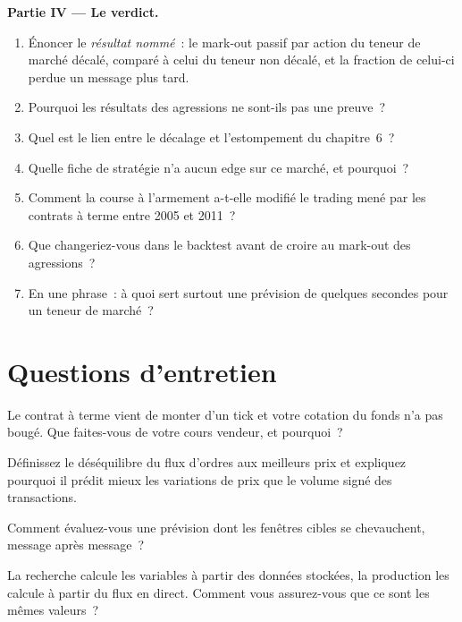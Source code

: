 \begin{problem}
\medskip\noindent\textbf{Partie IV --- Le verdict.}
\begin{enumerate}[resume]
\item Énoncer le \emph{résultat nommé}~: le mark-out passif par action du teneur de marché décalé, comparé à celui du teneur non décalé, et la fraction de celui-ci perdue
un message plus tard.
\item Pourquoi les résultats des agressions ne sont-ils pas une preuve~?
\item Quel est le lien entre le décalage et l'estompement du chapitre~6~?
\item Quelle fiche de stratégie n'a aucun edge sur ce marché, et pourquoi~?
\item Comment la course à l'armement a-t-elle modifié le trading mené par les contrats à terme entre 2005 et 2011~?
\item Que changeriez-vous dans le backtest avant de croire au mark-out des agressions~?
\item En une phrase~: à quoi sert surtout une prévision de quelques secondes pour un teneur de marché~?
\end{enumerate}
\end{problem}

\section{Questions d'entretien}

\begin{interviewq}\label{iq:hf:short-horizon-alpha:1}
Le contrat à terme vient de monter d'un tick et votre cotation du fonds n'a pas bougé. Que faites-vous de votre cours vendeur, et pourquoi~?
\end{interviewq}

\begin{interviewq}\label{iq:hf:short-horizon-alpha:2}
Définissez le déséquilibre du flux d'ordres aux meilleurs prix et expliquez pourquoi il prédit mieux les variations de prix que le volume signé des transactions.
\end{interviewq}

\begin{interviewq}\label{iq:hf:short-horizon-alpha:3}
Comment évaluez-vous une prévision dont les fenêtres cibles se chevauchent, message après message~?
\end{interviewq}

\begin{interviewq}\label{iq:hf:short-horizon-alpha:4}
La recherche calcule les variables à partir des données stockées, la production les calcule à partir du flux en direct. Comment vous assurez-vous que ce sont les mêmes valeurs~?
\end{interviewq}

